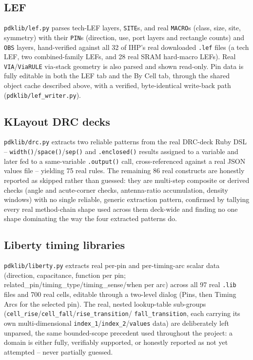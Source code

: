 \documentclass[a4paper,11pt]{article}
\begin{document}
\subsection{LEF}

\texttt{pdklib/lef.py} parses tech-LEF layers, \texttt{SITE}s, and real
\texttt{MACRO}s (class, size, site, symmetry) with their
\texttt{PIN}s (direction, use, port layers and rectangle counts) and
\texttt{OBS} layers, hand-verified against all 32 of IHP's real
downloaded \texttt{.lef} files (a tech LEF, two combined-family LEFs,
and 28 real SRAM hard-macro LEFs). Real \texttt{VIA}/\texttt{ViaRULE}
via-stack geometry is also parsed and shown read-only. Pin data is
fully editable in both the LEF tab and the By Cell tab, through the
shared object cache described above, with a verified, byte-identical
write-back path (\texttt{pdklib/lef\_writer.py}).

\subsection{KLayout DRC decks}

\texttt{pdklib/drc.py} extracts two reliable patterns from the real
DRC-deck Ruby DSL --
\texttt{width()}/\texttt{space()}/\texttt{sep()} and
\texttt{.enclosed()} results assigned to a variable and later fed to
a same-variable \texttt{.output()} call, cross-referenced against a
real JSON values file -- yielding 75 real rules. The remaining 86
real constructs are honestly reported as skipped rather than
guessed: they are multi-step composite or derived checks (angle and
acute-corner checks, antenna-ratio accumulation, density windows)
with no single reliable, generic extraction pattern, confirmed by
tallying every real method-chain shape used across them deck-wide and
finding no one shape dominating the way the four extracted patterns
do.

\subsection{Liberty timing libraries}

\texttt{pdklib/liberty.py} extracts real per-pin and per-timing-arc
scalar data (direction, capacitance, function per pin;
related\_pin/timing\_type/timing\_sense/when per arc) across all 97
real \texttt{.lib} files and 700 real cells, editable through a
two-level dialog (Pins, then Timing Arcs for the selected pin). The
real, nested lookup-table sub-groups
(\texttt{cell\_rise}/\texttt{cell\_fall}/\texttt{rise\_transition}/\allowbreak
\texttt{fall\_transition}, each carrying its own multi-dimensional
\texttt{index\_1}/\texttt{index\_2}/\texttt{values} data) are
deliberately left unparsed, the same bounded-scope precedent used
throughout the project: a domain is either fully, verifiably
supported, or honestly reported as not yet attempted -- never
partially guessed.
\end{document}
